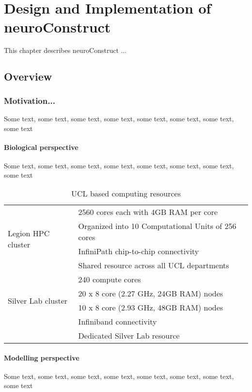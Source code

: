 

\renewcommand{\chaptermark}[1]{\markboth{#1}{}}
\renewcommand{\sectionmark}[1]{\markright{#1}{}}

\chapter{Design and Implementation of neuroConstruct}
\label{neuroConstruct}


This chapter describes neuroConstruct \citep{GleesonEtAl2007, Gleeson2008}...


\section{Overview}

\subsection{Motivation...}
\label{MyMotivation}

Some text, some text, some text, some text, some text, some text, some text, some text

\subsubsection{Biological perspective}

Some text, some text, some text, some text, some text, some text, some text, some text


\begin{table}
\begin{tabular}{|l|l|}
  \hline
  \multirow{4}{*}{Legion HPC cluster}  & 2560 cores each with 4GB RAM per core \\
  & Organized into 10 Computational Units of 256 cores \\
  & InfiniPath chip-to-chip connectivity\\ 
  & Shared resource across all UCL departments\\ \hline
  \multirow{4}{*}{Silver Lab cluster} & 240 compute cores \\
  & 20 x 8 core (2.27 GHz, 24GB RAM) nodes \\
  & 10 x 8 core (2.93 GHz, 48GB RAM) nodes \\
  & Infiniband connectivity \\
  & Dedicated Silver Lab resource\\ 
  \hline
\end{tabular}
\caption{UCL based computing resources} 
\label{UCLHPC}
\end{table}

\subsubsection{Modelling perspective}
 

Some text, some text, some text, some text, some text, some text, some text, some text

